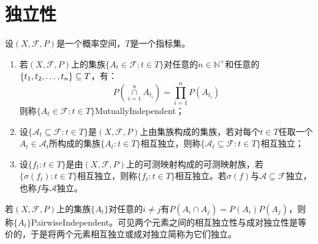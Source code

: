 \section{独立性}
\begin{definition}
	设$(X,\mathscr{F},P)$是一个概率空间，$T$是一个指标集。
	\begin{enumerate}
		\item 若$(X,\mathscr{F},P)$上的集族$\{A_t\in\mathscr{F}:t\in T\}$对任意的$n\in\mathbb{N}^+$和任意的$\{t_1, t_2, \dots, t_{n}\}\subseteq T$，有：
		\begin{equation*}
			P\left(\underset{i=1}{\overset{n}{\cap}}A_{t_i}\right)=\prod_{i=1}^{n}P(A_{t_i})
		\end{equation*}
		则称$\{A_t\in\mathscr{F}:t\in T\}$\gls{MutuallyIndependent}；
		\item 设$\{\mathscr{A}_t\subseteq\mathscr{F}:t\in T\}$是$(X,\mathscr{F},P)$上由集族构成的集族，若对每个$t\in T$任取一个$A_t\in\mathscr{A}_t$所构成的集族$\{A_t:t\in T\}$相互独立，则称$\{\mathscr{A}_t\subseteq\mathscr{F}:t\in T\}$相互独立；
		\item 设$\{f_t:t\in T\}$是由$(X,\mathscr{F},P)$上的可测映射构成的可测映射族，若$\{\sigma(f_t):t\in T\}$相互独立，则称$\{f_t:t\in T\}$相互独立。若$\sigma(f)$与$\mathscr{A}\subseteq\mathscr{F}$独立，也称$f$与$\mathscr{A}$独立。
	\end{enumerate}
	若$(X,\mathscr{F},P)$上的集族$\{A_t\}$对任意的$i\ne j$有$P(A_i\cap A_j)=P(A_i)P(A_j)$，则称$\{A_t\}$\gls{PairwiseIndependent}。可见两个元素之间的相互独立性与成对独立性是等价的，于是将两个元素相互独立或成对独立简称为它们独立。
\end{definition}

